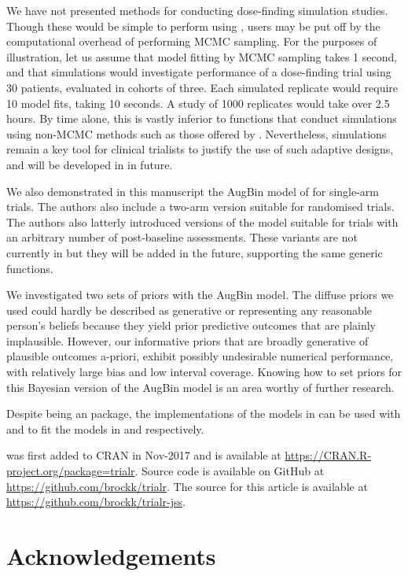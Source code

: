 \documentclass[article]{jss}
\begin{document}
We have not presented methods for conducting dose-finding simulation
studies. Though these would be simple to perform using ,
users may be put off by the computational overhead of performing MCMC
sampling. For the purposes of illustration, let us assume that model
fitting by MCMC sampling takes 1 second, and that simulations would
investigate performance of a dose-finding trial using 30 patients,
evaluated in cohorts of three. Each simulated replicate would require 10
model fits, taking 10 seconds. A study of 1000 replicates would take
over 2.5 hours. By time alone, this is vastly inferior to functions that
conduct simulations using non-MCMC methods such as those offered by
 \citep{dfcrm}. Nevertheless, simulations remain a key tool
for clinical trialists to justify the use of such adaptive designs, and
will be developed in  in future.

We also demonstrated in this manuscript the AugBin model of
\citet{Wason2013} for single-arm trials. The authors also include a
two-arm version suitable for randomised trials. The authors also
latterly introduced versions of the model suitable for trials with an
arbitrary number of post-baseline assessments. These variants are not
currently in  but they will be added in the future,
supporting the same generic functions.

We investigated two sets of priors with the AugBin model. The diffuse
priors we used could hardly be described as generative or representing
any reasonable person's beliefs because they yield prior predictive
outcomes that are plainly implausible. However, our informative priors
that are broadly generative of plausible outcomes a-priori, exhibit
possibly undesirable numerical performance, with relatively large bias
and low interval coverage. Knowing how to set priors for this Bayesian
version of the AugBin model is an area worthy of further research.

Despite being an  package, the 
implementations of the models in  can be used with
 and  to fit the models in 
and  respectively.

 was first added to CRAN in Nov-2017 and is available at
\url{https://CRAN.R-project.org/package=trialr}. Source code is
available on GitHub at \url{https://github.com/brockk/trialr}. The
source for this article is available at
\url{https://github.com/brockk/trialr-jss}.

\hypertarget{acknowledgements}{%
\section{Acknowledgements}\label{acknowledgements}}
\end{document}
